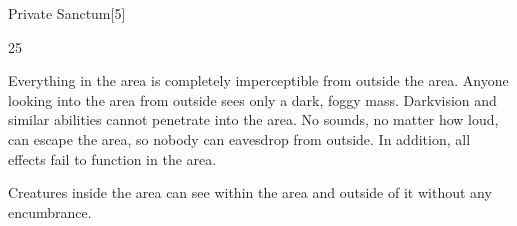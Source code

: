 \begin{spellsection}{Private Sanctum}[5]

\begin{spellcontent}

\begin{spelltargetinginfo}


 25
\end{spelltargetinginfo}


\begin{spelleffects}



\spelleffect
Everything in the area is completely imperceptible from outside the area.
Anyone looking into the area from outside sees only a dark, foggy mass.
Darkvision and similar abilities cannot penetrate into the area.
No sounds, no matter how loud, can escape the area, so nobody can eavesdrop from outside.
In addition, all  effects fail to function in the area.

Creatures inside the area can see within the area and outside of it without any encumbrance.








\end{spelleffects}

\end{spellcontent}
\begin{spellfooter}


\end{spellfooter}
\begin{spellsubcontent}


\end{spellsubcontent}
\end{spellsection}


